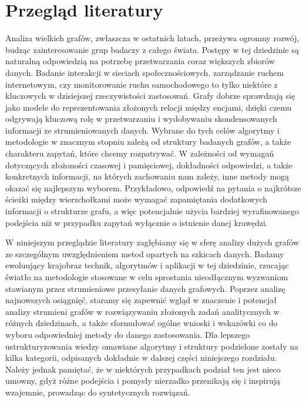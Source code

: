 \chapter{Przegląd literatury}\label{asddassad}

    Analiza wielkich grafów, zwłaszcza w ostatnich latach, przeżywa ogromny rozwój, budząc zainteresowanie grup badaczy z całego świata. Postępy w tej dziedzinie są naturalną odpowiedzią na potrzebę przetwarzania coraz większych zbiorów danych. Badanie interakcji w sieciach społecznościowych, zarządzanie ruchem internetowym, czy monitorowanie ruchu samochodowego to tylko niektóre z kluczowych w dzisiejszej rzeczywistości zastosowań. Grafy dobrze sprawdzają się jako modele do reprezentowania złożonych relacji między encjami, dzięki czemu odgrywają kluczową rolę w przetwarzaniu i wydobywaniu skondensowanych informacji ze strumieniowanych danych. Wybrane do tych celów algorytmy i metodologie w znacznym stopniu zależą od struktury badanych grafów, a także charakteru zapytań, które chcemy rozpatrywać. W zależności od wymagań dotyczących złożoności czasowej i pamięciowej, dokładności odpowiedzi, a także konkretnych informacji, na których zachowaniu nam zależy, inne metody mogą okazać się najlepszym wyborem. Przykładowo, odpowiedź na pytania o najkrótsze ścieżki między wierzchołkami może wymagać zapamiętania dodatkowych informacji o strukturze grafu, a więc potencjalnie użycia bardziej wyrafinowanego podejścia niż w przypadku zapytań wyłącznie o istnienie danej krawędzi. 

    W niniejszym przeglądzie literatury zagłębiamy się w sferę analizy dużych grafów ze szczególnym uwzględnieniem metod opartych na szkicach danych. Badamy ewoluujący krajobraz technik, algorytmów i aplikacji w tej dziedzinie, rzucając światło na metodologie stosowane w celu sprostania nieodłącznym wyzwaniom stawianym przez strumieniowe przesyłanie danych grafowych. Poprzez analizę najnowszych osiągnięć, staramy się zapewnić wgląd w znaczenie i potencjał analizy strumieni grafów w rozwiązywaniu złożonych zadań analitycznych w różnych dziedzinach, a także sformułować ogólne wnioski i wskazówki co do wyboru odpowiedniej metody do danego zastosowania. Dla lepszego ustrukturyzowania wiedzy omawiane algorytmy i struktury podzielone zostały na kilka kategorii, odpisanych dokładnie w dalszej części niniejszego rozdziału. Należy jednak pamiętać, że w niektórych przypadkach podział ten jest nieco umowny, gdyż różne podejścia i pomysły nierzadko przenikają się i inspirują wzajemnie, prowadząc do syntetycznych rozwiązań. 

